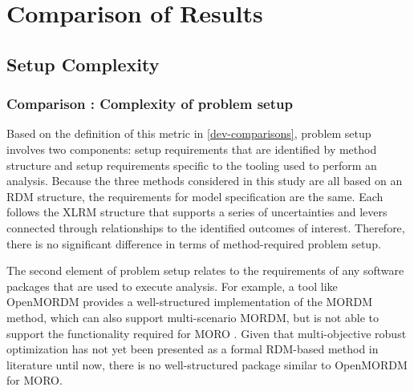  \setcounter{comparison}{1}

\chapter{Comparison of Results}\label{chapter-comparison}

\begin{abstract}
     This chapter will analyze and compare the results of each method and model variation pairing, according to the comparison metrics established in \cref{dev-comparisons}. In the same way that \cref{dev-comparisons} separated metrics into three main categories, the comparisons will also be discussed in three primary sections. The first, \cref{results-compare-complexity}, will discuss the two identified comparison methods that involve the setup needs for each method. Next, \cref{results-compare-communication} will cover the metrics related to method communication. Finally, the results themselves will be compared in \cref{results-compare-results}. 
\end{abstract}

\newpage

\section{Setup Complexity}\label{results-compare-complexity}
    \subsection{Comparison \thecomparison : Complexity of problem setup}
    Based on the definition of this metric in \cref{dev-comparisons}, problem setup involves two components: setup requirements that are identified by method structure and setup requirements specific to the tooling used to perform an analysis. Because the three methods considered in this study are all based on an RDM structure, the requirements for model specification are the same. Each follows the XLRM structure that supports a series of uncertainties and levers connected through relationships to the identified outcomes of interest. Therefore, there is no significant difference in terms of method-required problem setup. 
    
    The second element of problem setup relates to the requirements of any software packages that are used to execute analysis. For example, a tool like OpenMORDM provides a well-structured implementation of the MORDM method, which can also support multi-scenario MORDM, but is not able to support the functionality required for MORO \citep{Hadka2015}. Given that multi-objective robust optimization has not yet been presented as a formal RDM-based method in literature until now, there is no well-structured package similar to OpenMORDM for MORO. 
    
